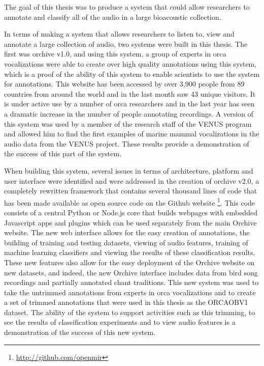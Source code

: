 \documentclass[12pt,oneside]{book}
\begin{document}
\label{chap:conclusions}

The goal of this thesis was to produce a system that could allow
researchers to annotate and classify all of the audio in a large
bioacoustic collection.

In terms of making a system that allows researchers to listen to, view
and annotate a large collection of audio, two systems were built in
this thesis.  The first was orchive v1.0, and using this system, a
group of \totalExperts experts in orca vocalizations were able to
create over \totalAnnotations high quality annotations using this
system, which is a proof of the ability of this system to enable
scientists to use the system for annotations.  This website has been
accessed by over 3,900 people from 89 countries from around the world
and in the last month saw 43 unique visitors.  It is under active use
by a number of orca researchers and in the last year has seen a
dramatic increase in the number of people annotating recordings.  A
version of this system was used by a member of the research staff of
the VENUS program and allowed him to find the first examples of marine
mammal vocalizations in the audio data from the VENUS project.  These
results provide a demonstration of the success of this part of the
system.

When building this system, several issues in terms of architecture,
platform and user interface were identified and were addressed in the
creation of orchive v2.0, a completely rewritten framework that
contains several thousand lines of code that has been made available
as open source code on the Github
website \footnote{\url{http://github.com/openmir}}.  This code
consists of a central Python or Node.js core that builds webpages with
embedded Javascript apps and plugins which can be used separately from
the main Orchive website.  The new web interface allows for the easy
creation of annotations, the building of training and testing
datasets, viewing of audio features, training of machine learning
classifiers and viewing the results of these classification results.
These new features also allow for the easy deployment of the Orchive
website on new datasets, and indeed, the new Orchive interface
includes data from bird song recordings and partially annotated chant
traditions.  This new system was used to take the untrimmed
annotations from experts in orca vocalizations and to create a set of
trimmed annotations that were used in this thesis as the ORCAOBV1
dataset.  The ability of the system to support activities such as this
trimming, to see the results of classification experiments and to view
audio features is a demonstration of the success of this new system.
\end{document}
